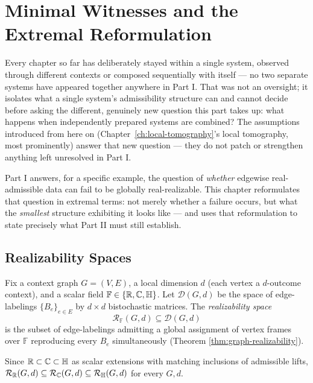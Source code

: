 \chapter{Minimal Witnesses and the Extremal Reformulation}
\label{ch:minimal-witnesses}

Every chapter so far has deliberately stayed within a single system, observed
through different contexts or composed sequentially with itself — no two
separate systems have appeared together anywhere in Part I. That was not an
oversight; it isolates what a single system's admissibility structure can and
cannot decide before asking the different, genuinely new question this part
takes up: what happens when independently prepared systems are combined? The
assumptions introduced from here on (Chapter~\ref{ch:local-tomography}'s local
tomography, most prominently) answer that new question — they do not patch
or strengthen anything left unresolved in Part I.

Part I answers, for a specific example, the question of \emph{whether} edgewise
real-admissible data can fail to be globally real-realizable. This chapter
reformulates that question in extremal terms: not merely whether a failure
occurs, but what the \emph{smallest} structure exhibiting it looks like — and
uses that reformulation to state precisely what Part II must still establish.

\section{Realizability Spaces}

\begin{definition}
\label{def:realizability-space}
Fix a context graph $G=(V,E)$, a local dimension $d$ (each vertex a
$d$-outcome context), and a scalar field $\mathbb F \in \{\mathbb{R},\mathbb{C},\mathbb{H}\}$. Let
$\mathcal D(G,d)$ be the space of edge-labelings $\{B_e\}_{e\in E}$ by
$d\times d$ bistochastic matrices. The \emph{realizability space}
\begin{equation}
\mathcal R_{\mathbb F}(G,d) \subseteq \mathcal D(G,d)
\end{equation}
is the subset of edge-labelings admitting a global assignment of vertex frames
over $\mathbb F$ reproducing every $B_e$ simultaneously (Theorem
\ref{thm:graph-realizability}).
\end{definition}

Since $\mathbb{R} \subset \mathbb{C} \subset \mathbb{H}$ as scalar extensions with matching
inclusions of admissible lifts, $\mathcal R_{\mathbb{R}}(G,d) \subseteq \mathcal
R_{\mathbb{C}}(G,d) \subseteq \mathcal R_{\mathbb{H}}(G,d)$ for every $G,d$.

